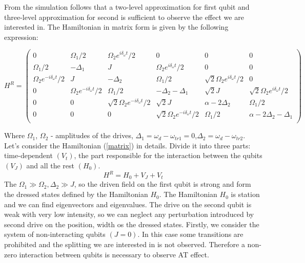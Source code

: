\documentclass[%
 aip,
 amsmath,amssymb,
 reprint,%
]{revtex4-1}
\begin{document}
From the simulation follows that a two-level approximation for first qubit and three-level approximation for second is sufficient to observe the effect we are interested in. The Hamiltonian in matrix form is given by the following expression:
\begin{widetext}
	\begin{equation}\label{matrix} 
	\text{$H^R$} = \left(\begin{matrix}
	0 & \text{$\Omega_1/2 $} & \text{$\Omega _2$} e^{i \text{$\delta_{\omega}$} t}/2 & 0 & 0 & 0 \\
	\text{$\Omega_1/2 $} & \text{$-\Delta_1 $} & J & \text{$\Omega_2$} e^{i \text{$\delta_{\omega}$} t}/2 & 0 & 0 \\
	\text{$\Omega_2$} e^{-i \text{$\delta_{\omega} $} t}/2 & J & -\text{$\Delta_2 $} &
	\text{$\Omega_1$/2} & \sqrt{2} \text{$\Omega_2$} e^{i \text{$\delta_{\omega}$} t}/2 & 0 \\
	0 & \text{$\Omega_2$} e^{-i \text{$\delta_{\omega} $} t}/2 & \text{$\Omega_1/2$} &
	\text{$-\Delta_2 -\Delta_1$} & \sqrt{2} J & \sqrt{2} \text{$\Omega_2$} e^{i \text{$\delta_{\omega}
			$} t}/2 \\
	0 & 0 & \sqrt{2} \text{$\Omega_2$} e^{-i \text{$\delta_{\omega}$} t}/2 & \sqrt{2} J &
	\text{$\alpha$}-2 \text{$\Delta_2$} & \text{$\Omega_1/2$} \\
	0 & 0 & 0 & \sqrt{2} \text{$\Omega_2$} e^{-i \text{$\delta_{\omega} $} t}/2 & \text{$\Omega_1/2
		$} & \text{$\alpha$}-2 \text{$\Delta_2$}- \text{$\Delta_1$} \\
	\end{matrix}\right)
	\end{equation}
\end{widetext}
Where $\Omega_1$, $\Omega_2$ - amplitudes of the drives, $\Delta_1 = \omega_d-\omega_{tr1}=0$,$\Delta_2 = \omega_d-\omega_{tr2}$.
Let's consider the Hamiltonian (\autoref{matrix}) in details. Divide it into three parts: time-dependent $(V_t)$, the part responsible for the interaction between the qubits $(V_J)$ and all the rest $(H_0)$.
\begin{equation}
	H^R=H_0+V_J+V_t
\end{equation}
The $\Omega_1\gg \Omega_2,\Delta_2\gg J$, so the driven field on the first qubit is strong and form the dressed states defined by the Hamiltonian $H_0$.
The Hamiltonian $H_0$ is station and we can find eigenvectors and eigenvalues. The drive on the second qubit is weak with very low intensity, so we can neglect any perturbation introduced by second drive on the position, width os the dressed states.
Firstly, we consider the system of non-interacting qubits $(J=0)$. In this case some transitions are prohibited and the splitting we are interested in is not observed. 
Therefore a non-zero interaction between qubits is necessary to observe AT effect.
\end{document}
